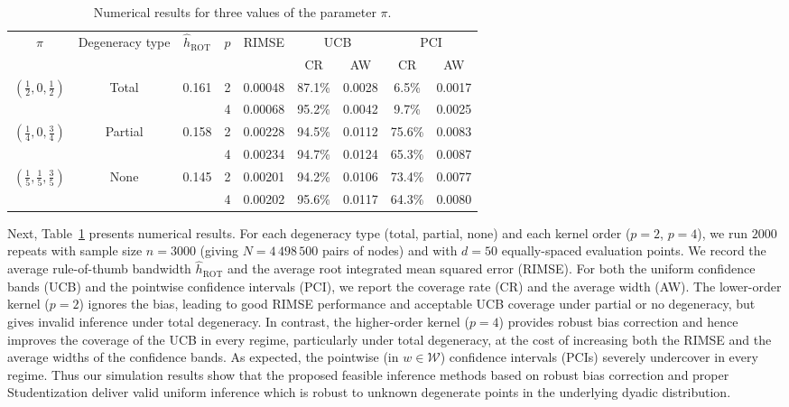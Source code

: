 \documentclass[11pt,lof]{puthesis}
\newcommand{\cW}{\ensuremath{\mathcal{W}}}
\DeclareMathOperator{\ROT}{ROT}
\theoremstyle{break}
\theoremstyle{proof}
\begin{document}
\begin{table}[b!]
\centering
\begin{tabular}{|c|c|c|c|c|cc|cc|}
\hline
\multirow{2}{*}{$ \pi $}
& \multirow{2}{*}{Degeneracy type}
& \multirow{2}{*}{$ \hat h_{\ROT} $}
& \multirow{2}{*}{$ p $}
& \multirow{2}{*}{RIMSE}
& \multicolumn{2}{|c|}{UCB}
& \multicolumn{2}{|c|}{PCI} \\
\cline{6-9}
& & & &
& CR & AW
& CR & AW \\
\hline
\multirow{2}{*}{$ \left(\frac{1}{2}, 0, \frac{1}{2}\right) $}
& \multirow{2}{*}{Total}
& \multirow{2}{*}{0.161}
& 2 & 0.00048 & 87.1\% & 0.0028 & 6.5\% & 0.0017 \\
& & & 4 & 0.00068 & 95.2\% & 0.0042 & 9.7\% & 0.0025 \\
\hline
\multirow{2}{*}{$ \left(\frac{1}{4}, 0, \frac{3}{4}\right) $}
& \multirow{2}{*}{Partial}
& \multirow{2}{*}{0.158}
& 2 & 0.00228 & 94.5\% & 0.0112 & 75.6\% & 0.0083 \\
& & & 4 & 0.00234 & 94.7\% & 0.0124 & 65.3\% & 0.0087 \\
\hline
\multirow{2}{*}{$ \left(\frac{1}{5}, \frac{1}{5}, \frac{3}{5}\right) $}
& \multirow{2}{*}{None}
& \multirow{2}{*}{0.145}
& 2 & 0.00201 & 94.2\% & 0.0106 & 73.4\% & 0.0077 \\
& & & 4 & 0.00202 & 95.6\% & 0.0117 & 64.3\% & 0.0080 \\
\hline
\end{tabular}
\caption[Numerical results for three values of the parameter $\pi$]{
Numerical results for three values of the parameter $\pi$.}
\label{tab:kernel_results}
\end{table}

Next, Table~\ref{tab:kernel_results} presents numerical results. For each
degeneracy
type (total, partial, none) and each kernel order ($p=2$, $p=4$), we run $2000$
repeats with sample size $n=3000$ (giving $N=4\,498\,500$ pairs of nodes) and
with $d=50$ equally-spaced evaluation points. We record the average
rule-of-thumb bandwidth $\hat{h}_{\ROT}$ and the average root integrated mean
squared error (RIMSE). For both the uniform confidence bands (UCB) and the
pointwise confidence intervals (PCI), we report the coverage rate (CR) and the
average width (AW).
%
The lower-order kernel ($p=2$) ignores the bias, leading to good RIMSE
performance and acceptable UCB coverage under partial or no degeneracy, but
gives invalid inference under total degeneracy. In contrast, the higher-order
kernel ($p=4$) provides robust bias correction and hence improves the coverage
of the UCB in every regime, particularly under total degeneracy, at the cost of
increasing both the RIMSE and the average widths of the confidence bands.
%
As expected, the pointwise (in $w\in\cW$) confidence intervals (PCIs) severely
undercover in every regime. Thus our simulation results show that the proposed
feasible inference methods based on robust bias correction and proper
Studentization deliver valid uniform inference which is robust to unknown
degenerate points in the underlying dyadic distribution.
\end{document}
